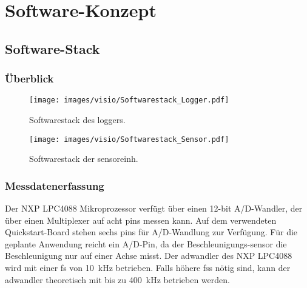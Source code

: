 %
%

\chapter{Software-Konzept}\label{chap.software}

\section{Software-Stack}\label{sec.sw_stack}


\subsection{Überblick}\label{subsec.sw_ueberblick}

\begin{figure}
	\centering
		\texttt{[image: images/visio/Softwarestack\_Logger.pdf]}
	\caption{Softwarestack des \gls{logger}s.}
	\label{fig.sw_logger}
\end{figure}

\begin{figure}
	\centering
		\texttt{[image: images/visio/Softwarestack\_Sensor.pdf]}
	\caption{Softwarestack der \gls{sensoreinh}.}
	\label{fig.sw_sensor}
\end{figure}



\subsection{Messdatenerfassung}\label{subsec.sw_messen}
Der NXP LPC4088 Mikroprozessor verfügt über einen 12-bit A/D-Wandler, der über einen Multiplexer auf acht \glspl{pin} messen kann. Auf dem verwendeten Quickstart-Board stehen sechs \glspl{pin} für A/D-Wandlung zur Verfügung. Für die geplante Anwendung reicht ein A/D-Pin, da der Beschleunigungs-\gls{sensor} die Beschleunigung nur auf einer Achse misst. Der \gls{adwandler} des NXP LPC4088 wird mit einer \gls{fs} von 10~kHz betrieben. Falls höhere \glspl{fs} nötig sind, kann der \gls{adwandler} theoretisch mit bis zu 400~kHz betrieben werden.


